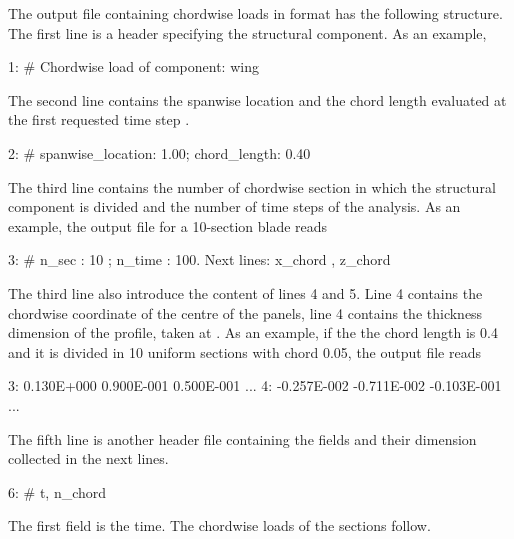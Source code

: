 The output file containing chordwise loads in  format has 
the following structure. The first line is a header specifying the 
structural component. As an example,
\begin{inputfile}[frame=single]
  1: # Chordwise load of component: wing
\end{inputfile}
The second line contains the spanwise location and the chord length evaluated at the first requested
time step .  
\begin{inputfile}[frame=single]
  2: # spanwise_location:    1.00; chord_length:  0.40     
\end{inputfile}
The third line contains the number of chordwise section  in which the 
structural component is divided and the number of time steps 
of the analysis. As an example, the output file for a 10-section blade reads
\begin{inputfile}[frame=single]
 3: # n_sec : 10 ; n_time : 100. Next lines: x_chord , z_chord
\end{inputfile}
The third line also introduce the content of lines 4 and 5. Line 4 contains 
the chordwise coordinate  of the centre of the panels, 
line 4 contains the thickness dimension  of the profile, taken at .
As an example, if the the chord length is 0.4 and it is divided in 10 uniform sections with chord 0.05, 
the output file reads
\begin{inputfile}[frame=single]
 3:  0.130E+000  0.900E-001  0.500E-001 ...
 4: -0.257E-002 -0.711E-002 -0.103E-001 ...
\end{inputfile}
The fifth line is another header file containing the fields and their 
dimension collected in the next  lines.
\begin{inputfile}[frame=single]
  6: # t, n_chord
\end{inputfile}
The first field is the time. The chordwise loads of the  
sections follow. 

